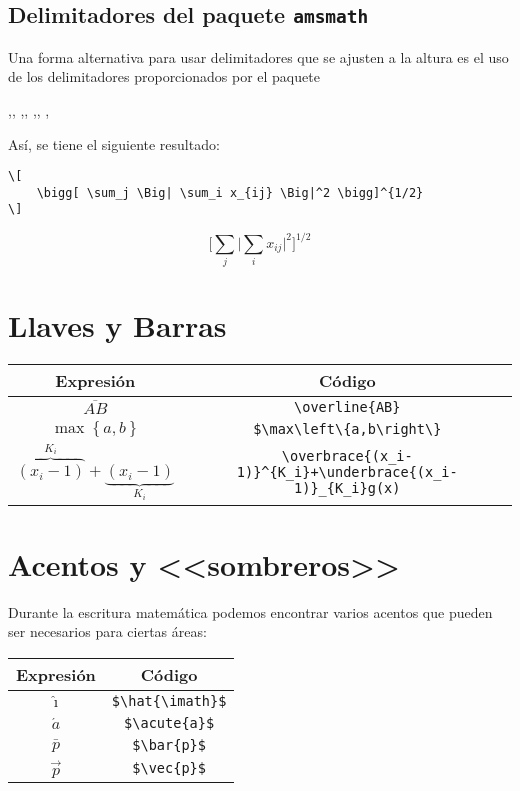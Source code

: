 \documentclass[a4,10pt]{aleph-notas}
\theoremstyle{definition}
\theoremstyle{plain}
\begin{document}
\subsection{Delimitadores del paquete \texttt{amsmath}}

Una forma alternativa para usar delimitadores que se ajusten a la altura es el uso de los delimitadores proporcionados por el paquete \verb@amsmath@

\bigskip
\noindent
\verb@\Biggl,\Biggr, \biggl,\biggr, \Bigl,\Bigr, \bigl,\bigr@
\bigskip

Así, se tiene el siguiente resultado:

\begin{lstlisting}[frame=single]
\[
    \bigg[ \sum_j \Big| \sum_i x_{ij} \Big|^2 \bigg]^{1/2}
\]
\end{lstlisting}

\[
    \bigg[ \sum_j \Big| \sum_i x_{ij} \Big|^2 \bigg]^{1/2}
\]


\section{Llaves y Barras}

\begin{center}
\begin{tabular}{|c|c|}
    \hline
    Expresión & Código  \\ \hline
    $\overline{AB}$ & \verb"\overline{AB}" \\ \hline
    $\max\left\{a,b\right\}$ & \verb"$\max\left\{a,b\right\}" \\ \hline
    $\overbrace{(x_i-1)}^{K_i}+\underbrace{(x_i-1)}_{K_i}$ & \verb"\overbrace{(x_i-1)}^{K_i}+\underbrace{(x_i-1)}_{K_i}g(x)" \\ \hline
\end{tabular}
\end{center}

\section{Acentos y <<sombreros>>}

Durante la escritura matemática podemos encontrar varios acentos que pueden ser necesarios para ciertas áreas:

\begin{center}
\begin{tabular}{|c|c|}
    \hline
    Expresión & Código  \\ \hline
    $\hat{\imath}$ & \verb"$\hat{\imath}$" \\ \hline
    $\acute{a}$ & \verb"$\acute{a}$" \\ \hline
    $\bar{p}$ & \verb"$\bar{p}$" \\ \hline
    $\vec{p}$ & \verb"$\vec{p}$" \\ \hline
\end{tabular}
\end{center}
\end{document}
